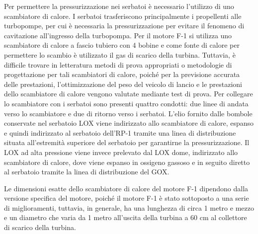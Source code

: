 Per permettere la pressurizzazione nei serbatoi è necessario l’utilizzo di uno scambiatore di calore.
I serbatoi trasferiscono principalmente i propellenti alle turbopompe, per cui è necessaria la pressurizzazione per evitare il fenomeno di cavitazione all'ingresso della turbopompa. 
Per il motore F-1 si utilizza uno scambiatore di calore a fascio tubiero con 4 bobine e come fonte di calore per permettere lo scambio è utilizzato il gas di scarico della turbina.
Tuttavia, è difficile trovare in letteratura metodi di prova appropriati o metodologie di progettazione per tali scambiatori di calore, poiché per la previsione accurata delle prestazioni, l'ottimizzazione del peso del veicolo di lancio e le prestazioni dello scambiatore di calore vengono valutate mediante test di prova. 
Per collegare lo scambiatore con i serbatoi sono presenti quattro condotti: due linee di andata verso lo scambiatore e due di ritorno verso i serbatoi.
L'elio fornito dalle bombole conservate nel serbatoio LOX viene indirizzato allo scambiatore di calore, espanso e quindi indirizzato al serbatoio dell’RP-1 tramite una linea di distribuzione situata all'estremità superiore del serbatoio per garantirne la pressurizzazione. 
Il LOX ad alta pressione viene invece prelevato dal LOX dome, indirizzato allo scambiatore di calore, dove viene espanso in ossigeno gassoso e in seguito diretto al serbatoio tramite la linea di distribuzione del GOX.

Le dimensioni esatte dello scambiatore di calore del motore F-1 dipendono dalla versione specifica del motore, poiché il motore F-1 è stato sottoposto a una serie di miglioramenti, tuttavia, in generale, ha una lunghezza di circa 1 metro e mezzo e un diametro che varia da 1 metro all'uscita della turbina a 60 cm al collettore di scarico della turbina. 


